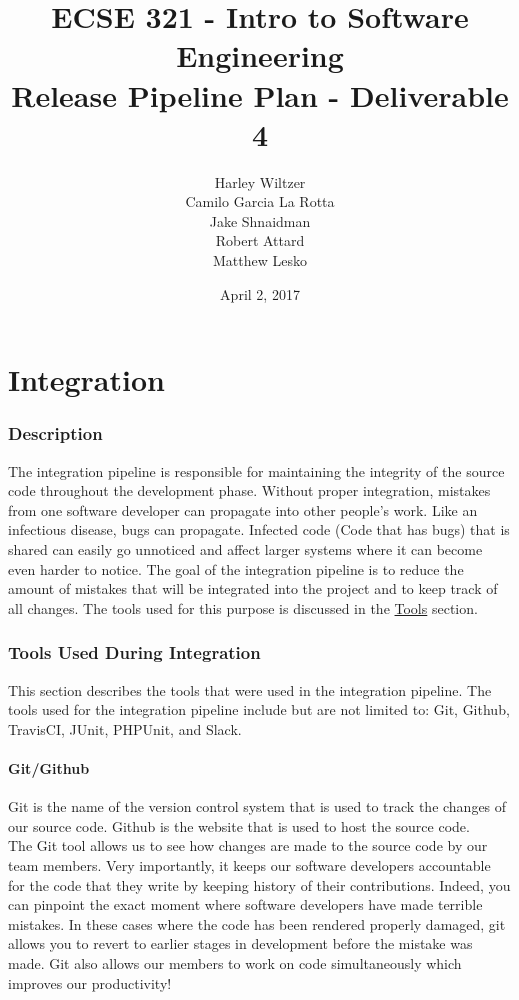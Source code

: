 \documentclass[12pt]{report}
\title{ECSE 321 - Intro to Software Engineering\\Release Pipeline Plan - Deliverable 4}
\author{Harley Wiltzer\\Camilo Garcia La Rotta\\Jake Shnaidman\\Robert Attard\\Matthew Lesko}
\date{April 2, 2017}
\begin{document}
\maketitle
\newpage
{} %
\tableofcontents
\part{Integration}
\section{Description}
The integration pipeline is responsible for maintaining the integrity of the source code throughout the development phase. Without proper integration, mistakes from one software developer can propagate into other people's work. Like an infectious disease, bugs can propagate. Infected code (Code that has bugs) that is shared can easily go unnoticed and affect larger systems where it can become even harder to notice. The goal of the integration pipeline is to reduce the amount of mistakes that will be integrated into the project and to keep track of all changes. The tools used for this purpose is discussed in the \hyperref[s:integration-tools]{Tools} section.

\section{Tools Used During Integration}
\label{s:integration-tools}
This section describes the tools that were used in the integration pipeline. The tools used for the integration pipeline include but are not limited to: Git, Github, TravisCI, JUnit, PHPUnit, and Slack.

\subsection{Git/Github}

Git is the name of the version control system that is used to track the changes of our source code. Github is the website that is used to host the source code. \\

The Git tool allows us to see how changes are made to the source code by our team members. Very importantly, it keeps our software developers accountable for the code that they write by keeping history of their contributions. Indeed, you can pinpoint the exact moment where software developers have made terrible mistakes. In these cases where the code has been rendered properly damaged, git allows you to revert to earlier stages in development before the mistake was made. Git also allows our members to work on code simultaneously which improves our productivity!\\
\end{document}
